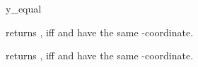 \begin{ccRefFunction}{y_equal}

         {returns , iff  and 
	  have the same -coordinate.}

         {returns , iff  and 
	  have the same -coordinate.}
\end{ccRefFunction}

